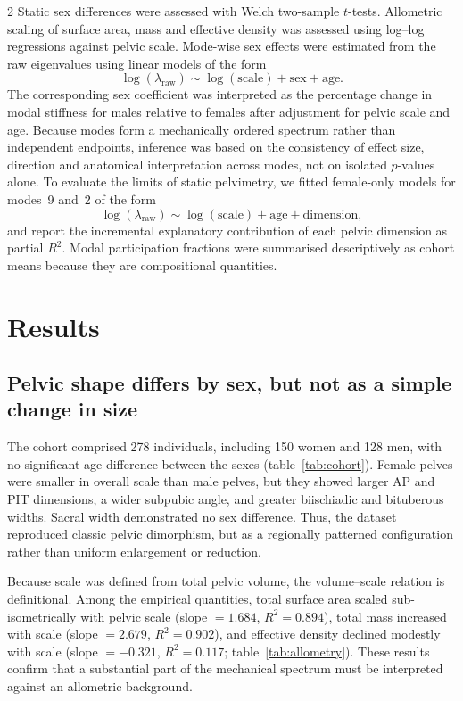 \documentclass[openacc]{rsproca_new}
\begin{document}
\begin{multicols}{2}
Static sex differences were assessed with Welch two-sample $t$-tests. Allometric scaling of surface area, mass and effective density was assessed using log--log regressions against pelvic scale. Mode-wise sex effects were estimated from the raw eigenvalues using linear models of the form
\begin{equation}
\log(\lambda_{\mathrm{raw}}) \sim \log(\mathrm{scale}) + \mathrm{sex} + \mathrm{age}.
\end{equation}
The corresponding sex coefficient was interpreted as the percentage change in modal stiffness for males relative to females after adjustment for pelvic scale and age. Because modes form a mechanically ordered spectrum rather than independent endpoints, inference was based on the consistency of effect size, direction and anatomical interpretation across modes, not on isolated $p$-values alone. To evaluate the limits of static pelvimetry, we fitted female-only models for modes~9 and~2 of the form
\begin{equation}
\log(\lambda_{\mathrm{raw}}) \sim \log(\mathrm{scale}) + \mathrm{age} + \mathrm{dimension},
\end{equation}
and report the incremental explanatory contribution of each pelvic dimension as partial $R^2$. Modal participation fractions were summarised descriptively as cohort means because they are compositional quantities.

\section{Results}
\subsection{Pelvic shape differs by sex, but not as a simple change in size}


The cohort comprised 278 individuals, including 150 women and 128 men, with no significant age difference between the sexes (table~\ref{tab:cohort}). Female pelves were smaller in overall scale than male pelves, but they showed larger AP and PIT dimensions, a wider subpubic angle, and greater biischiadic and bituberous widths. Sacral width demonstrated no sex difference. Thus, the dataset reproduced classic pelvic dimorphism, but as a regionally patterned configuration rather than uniform enlargement or reduction.

Because scale was defined from total pelvic volume, the volume--scale relation is definitional. Among the empirical quantities, total surface area scaled sub-isometrically with pelvic scale (slope $=1.684$, $R^2=0.894$), total mass increased with scale (slope $=2.679$, $R^2=0.902$), and effective density declined modestly with scale (slope $=-0.321$, $R^2=0.117$; table~\ref{tab:allometry}). These results confirm that a substantial part of the mechanical spectrum must be interpreted against an allometric background.


\end{multicols}
\end{document}
